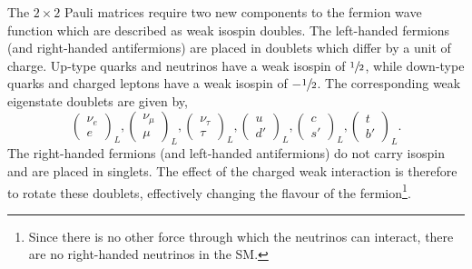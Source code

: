 The $2 \times 2$ Pauli matrices require two new components to the fermion wave function which are described as weak isospin doubles.
The left-handed fermions (and right-handed antifermions)
are placed in doublets which differ by a unit of charge.
Up-type quarks and neutrinos have a weak isospin of $\sfrac{1}{2}$, while down-type quarks and charged leptons have a weak isospin of $-\sfrac{1}{2}$.
The corresponding weak eigenstate doublets are given by,
\begin{equation}
	\label{eq:weak_isospin}
	\begin{pmatrix} \nu_e \\ e \end{pmatrix}_L,
	\begin{pmatrix} \nu_\mu \\ \mu \end{pmatrix}_L,
	\begin{pmatrix} \nu_\tau \\ \tau \end{pmatrix}_L,
	\begin{pmatrix} u \\ d' \end{pmatrix}_L,
	\begin{pmatrix} c \\ s' \end{pmatrix}_L,
	\begin{pmatrix} t \\ b' \end{pmatrix}_L.
\end{equation}
The right-handed fermions (and left-handed antifermions) do not carry isospin and are placed in singlets.
The effect of the charged weak interaction is therefore to rotate these doublets, effectively changing the flavour of the fermion\footnote{Since there is no other force through which the neutrinos can interact, there are no right-handed neutrinos in the SM.}.

